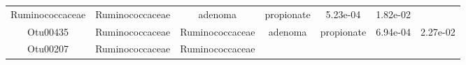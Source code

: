 \documentclass[11pt,]{article}
\begin{document}
\begin{longtable}[]{@{}ccccccc@{}}
\begin{minipage}[t]{0.17\columnwidth}
Ruminococcaceae\strut
\end{minipage} & \begin{minipage}[t]{0.17\columnwidth}\centering\strut
Ruminococcaceae\strut
\end{minipage} & \begin{minipage}[t]{0.09\columnwidth}\centering\strut
adenoma\strut
\end{minipage} & \begin{minipage}[t]{0.11\columnwidth}\centering\strut
propionate\strut
\end{minipage} & \begin{minipage}[t]{0.09\columnwidth}\centering\strut
5.23e-04\strut
\end{minipage} & \begin{minipage}[t]{0.09\columnwidth}\centering\strut
1.82e-02\strut
\end{minipage}\tabularnewline
\begin{minipage}[t]{0.09\columnwidth}\centering\strut
Otu00435\strut
\end{minipage} & \begin{minipage}[t]{0.17\columnwidth}\centering\strut
Ruminococcaceae\strut
\end{minipage} & \begin{minipage}[t]{0.17\columnwidth}\centering\strut
Ruminococcaceae\strut
\end{minipage} & \begin{minipage}[t]{0.09\columnwidth}\centering\strut
adenoma\strut
\end{minipage} & \begin{minipage}[t]{0.11\columnwidth}\centering\strut
propionate\strut
\end{minipage} & \begin{minipage}[t]{0.09\columnwidth}\centering\strut
6.94e-04\strut
\end{minipage} & \begin{minipage}[t]{0.09\columnwidth}\centering\strut
2.27e-02\strut
\end{minipage}\tabularnewline
\begin{minipage}[t]{0.09\columnwidth}\centering\strut
Otu00207\strut
\end{minipage} & \begin{minipage}[t]{0.17\columnwidth}\centering\strut
Ruminococcaceae\strut
\end{minipage} & \begin{minipage}[t]{0.17\columnwidth}\centering\strut
Ruminococcaceae\strut
\end{minipage} & \begin{minipage}[t]{0.09\columnwidth}\centering\strut

\end{minipage}
\end{longtable}
\end{document}
